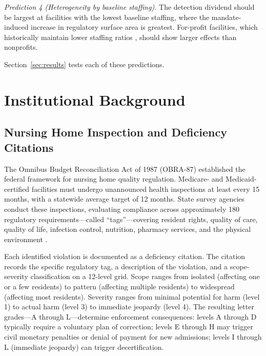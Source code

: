\documentclass[12pt]{article}
\begin{document}
\textit{Prediction 4 (Heterogeneity by baseline staffing).} The detection dividend should be largest at facilities with the lowest baseline staffing, where the mandate-induced increase in regulatory surface area is greatest. For-profit facilities, which historically maintain lower staffing ratios \citep{harrington2012}, should show larger effects than nonprofits.

Section~\ref{sec:results} tests each of these predictions.


\section{Institutional Background}
\label{sec:background}

\subsection{Nursing Home Inspection and Deficiency Citations}

The Omnibus Budget Reconciliation Act of 1987 (OBRA-87) established the federal framework for nursing home quality regulation. Medicare- and Medicaid-certified facilities must undergo unannounced health inspections at least every 15 months, with a statewide average target of 12 months. State survey agencies conduct these inspections, evaluating compliance across approximately 180 regulatory requirements---called ``tags''---covering resident rights, quality of care, quality of life, infection control, nutrition, pharmacy services, and the physical environment \citep{cms2023som}.

Each identified violation is documented as a deficiency citation. The citation records the specific regulatory tag, a description of the violation, and a scope-severity classification on a 12-level grid. Scope ranges from isolated (affecting one or a few residents) to pattern (affecting multiple residents) to widespread (affecting most residents). Severity ranges from minimal potential for harm (level 1) to actual harm (level 3) to immediate jeopardy (level 4). The resulting letter grades---A through L---determine enforcement consequences: levels A through D typically require a voluntary plan of correction; levels E through H may trigger civil monetary penalties or denial of payment for new admissions; levels I through L (immediate jeopardy) can trigger decertification.
\end{document}
